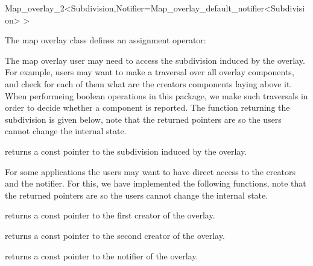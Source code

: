 \begin{ccRefClass}{Map_overlay_2<Subdivision,Notifier=Map_overlay_default_notifier<Subdivision> >}
\begin{ccAdvanced}




\end{ccAdvanced}

The map overlay class defines an assignment operator:



The map overlay user may need to access the subdivision induced by the overlay. 
For example, users may want to make a traversal over all overlay 
components, and check for each of them what are the creators 
components laying above it. 
When performeing boolean operations in this package,
we make such traversals in order to decide whether a component 
is reported.
The function returning the subdivision is given below, 
note that the returned pointers are  so
the users cannot change the internal state.

    {returns a const pointer to the subdivision induced by the overlay.}

\begin{ccAdvanced}
    For some applications the users may want to have direct access to
    the creators and the notifier. For this, we have implemented the 
    following functions, note that the returned pointers are  so
    the users cannot change the internal state.

    {returns a const pointer to the first creator of the overlay.}

    {returns a const pointer to the second creator of the overlay.}

    {returns a const pointer to the notifier of the overlay.}
    
\end{ccAdvanced}

\ccSeeAlso
{}\\

\end{ccRefClass}

